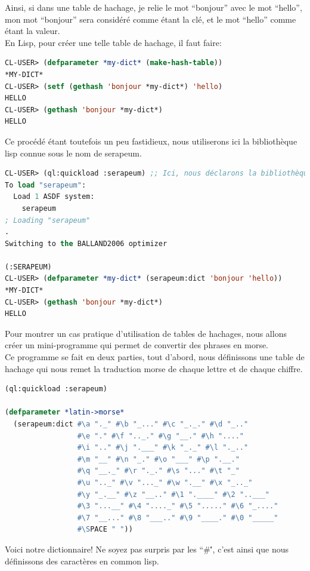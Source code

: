 \documentclass[a4paper, 12pt]{article}
\numberwithin{equation}{subsection}
\begin{document}
Ainsi, si dans une table de hachage, je relie le mot ``bonjour'' avec le mot ``hello'', mon mot ``bonjour'' sera considéré comme étant la clé, et le mot ``hello'' comme étant la valeur. \\

En Lisp, pour créer une telle table de hachage, il faut faire: \\
\begin{lstlisting}[language=Lisp]
CL-USER> (defparameter *my-dict* (make-hash-table))
*MY-DICT*
CL-USER> (setf (gethash 'bonjour *my-dict*) 'hello)
HELLO
CL-USER> (gethash 'bonjour *my-dict*)
HELLO
\end{lstlisting}
Ce procédé étant toutefois un peu fastidieux, nous utiliserons ici la bibliothèque lisp connue sous le nom de serapeum. \\
\begin{lstlisting}[language=Lisp]
CL-USER> (ql:quickload :serapeum) ;; Ici, nous déclarons la bibliothèque.
To load "serapeum":
  Load 1 ASDF system:
    serapeum
; Loading "serapeum"
.
Switching to the BALLAND2006 optimizer

(:SERAPEUM)
CL-USER> (defparameter *my-dict* (serapeum:dict 'bonjour 'hello))
*MY-DICT*
CL-USER> (gethash 'bonjour *my-dict*)
HELLO
\end{lstlisting}
Pour montrer un cas pratique d'utilisation de tables de hachages, nous allons créer un mini-programme qui permet de convertir des phrases en morse. \\

Ce programme se fait en deux parties, tout d'abord, nous définissons une table de hachage qui nous remet la traduction morse de chaque lettre et de chaque chiffre. \\
\begin{lstlisting}[language=Lisp]
(ql:quickload :serapeum)

(defparameter *latin->morse*
  (serapeum:dict #\a "._" #\b "_..." #\c "_._." #\d "_.."
                 #\e "." #\f ".._." #\g "__." #\h "...."
                 #\i ".." #\j ".___" #\k "_._" #\l "._.."
                 #\m "__" #\n "_." #\o "___" #\p ".__."
                 #\q "__._" #\r "._." #\s "..." #\t "_"
                 #\u ".._" #\v "..._" #\w ".__" #\x "_.._"
                 #\y "_.__" #\z "__.." #\1 ".____" #\2 "..___"
                 #\3 "...__" #\4 "...._" #\5 "....." #\6 "_...."
                 #\7 "__..." #\8 "___.." #\9 "____." #\0 "_____"
                 #\SPACE " "))
\end{lstlisting}
Voici notre dictionnaire! Ne soyez pas surpris par les ``\#\'', c'est ainsi que nous définissons des caractères en common lisp. \\
\end{document}
